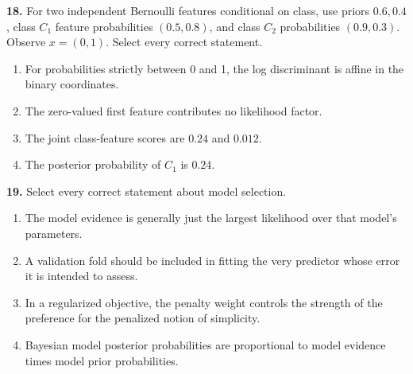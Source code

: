 \documentclass[11pt,a4paper]{article}
\begin{document}
\par\noindent\begin{minipage}{\linewidth}
\textbf{18.} For two independent Bernoulli features conditional on class, use priors \(0.6,0.4\), class \(C_1\) feature probabilities \((0.5,0.8)\), and class \(C_2\) probabilities \((0.9,0.3)\). Observe \(x=(0,1)\). Select every correct statement.
\begin{enumerate}[label=(\Alph*),leftmargin=8mm,itemsep=2pt,topsep=2pt]
\item For probabilities strictly between 0 and 1, the log discriminant is affine in the binary coordinates.
\item The zero-valued first feature contributes no likelihood factor.
\item The joint class-feature scores are \(0.24\) and \(0.012\).
\item The posterior probability of \(C_1\) is \(0.24\).
\end{enumerate}

\end{minipage}\par\vspace{3mm}
\par\noindent\begin{minipage}{\linewidth}
\textbf{19.} Select every correct statement about model selection.
\begin{enumerate}[label=(\Alph*),leftmargin=8mm,itemsep=2pt,topsep=2pt]
\item The model evidence is generally just the largest likelihood over that model's parameters.
\item A validation fold should be included in fitting the very predictor whose error it is intended to assess.
\item In a regularized objective, the penalty weight controls the strength of the preference for the penalized notion of simplicity.
\item Bayesian model posterior probabilities are proportional to model evidence times model prior probabilities.
\end{enumerate}

\end{minipage}\par\vspace{3mm}
\end{document}
